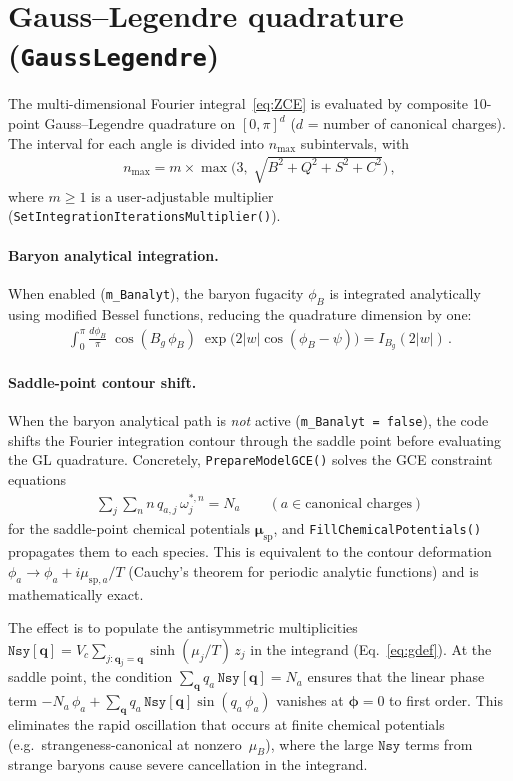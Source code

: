 \documentclass[11pt]{article}
\newcommand{\bphi}{\bm{\phi}}
\newcommand{\bmu}{\bm{\mu}}
\newcommand{\bq}{\mathbf{q}}
\begin{document}
\section{Gauss--Legendre quadrature (\texttt{GaussLegendre})}
\label{sec:GL}

The multi-dimensional Fourier integral~\eqref{eq:ZCE} is evaluated by composite 10-point Gauss--Legendre quadrature on $[0,\pi]^d$ ($d$ = number of canonical charges).
The interval for each angle is divided into $n_\mathrm{max}$ subintervals, with
\begin{align}
  n_\mathrm{max} = m \times \max\!\Big(3,\;\sqrt{B^2+Q^2+S^2+C^2}\Big) \,,
\end{align}
where $m \geq 1$ is a user-adjustable multiplier (\texttt{SetIntegrationIterationsMultiplier()}).

\paragraph{Baryon analytical integration.}
When enabled (\texttt{m\_Banalyt}), the baryon fugacity $\phi_B$ is integrated analytically using modified Bessel functions, reducing the quadrature dimension by one:
\begin{align}
  \int_0^\pi \frac{d\phi_B}{\pi}\;\cos(B_g\,\phi_B)\;\exp\!\Big(2|w|\cos(\phi_B - \psi)\Big)
  = I_{B_g}(2|w|) \,.
\end{align}

\paragraph{Saddle-point contour shift.}
When the baryon analytical path is \emph{not} active (\texttt{m\_Banalyt = false}), the code shifts the Fourier integration contour through the saddle point before evaluating the GL quadrature.
Concretely, \texttt{PrepareModelGCE()} solves the GCE constraint equations
\begin{align}
  \sum_j \sum_n n\,q_{a,j}\,\omega_j^{*,n} = N_a
  \qquad (a \in \text{canonical charges})
\end{align}
for the saddle-point chemical potentials $\bmu_\mathrm{sp}$, and \texttt{FillChemicalPotentials()} propagates them to each species.
This is equivalent to the contour deformation $\phi_a \to \phi_a + i\mu_{\mathrm{sp},a}/T$ (Cauchy's theorem for periodic analytic functions) and is mathematically exact.

The effect is to populate the antisymmetric multiplicities $\texttt{Nsy}[\bq] = V_c\sum_{j:\bq_j=\bq}\sinh(\mu_j/T)\,z_j$ in the integrand (Eq.~\ref{eq:gdef}).
At the saddle point, the condition $\sum_{\bq} q_a\,\texttt{Nsy}[\bq] = N_a$ ensures that the linear phase term $-N_a\,\phi_a + \sum_{\bq} q_a\,\texttt{Nsy}[\bq]\sin(q_a\,\phi_a)$ vanishes at $\bphi = 0$ to first order.
This eliminates the rapid oscillation that occurs at finite chemical potentials (e.g.\ strangeness-canonical at nonzero~$\mu_B$), where the large $\texttt{Nsy}$ terms from strange baryons cause severe cancellation in the integrand.
\end{document}
